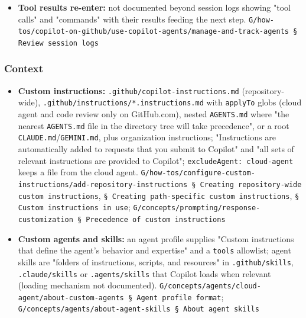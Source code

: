 \begin{itemize}
\item \textbf{Tool results re-enter:} not documented beyond session logs showing "tool calls" and "commands" with their results feeding the next step. \texttt{G/\allowbreak{}how-\allowbreak{}tos/\allowbreak{}copilot-\allowbreak{}on-\allowbreak{}github/\allowbreak{}use-\allowbreak{}copilot-\allowbreak{}agents/\allowbreak{}manage-\allowbreak{}and-\allowbreak{}track-\allowbreak{}agents § Review session logs}
\end{itemize}

\subsubsection*{Context}
\begin{itemize}
\item \textbf{Custom instructions:} \texttt{.\allowbreak{}github/\allowbreak{}copilot-\allowbreak{}instructions.\allowbreak{}md} (repository-wide), \texttt{.\allowbreak{}github/\allowbreak{}instructions/\allowbreak{}*.\allowbreak{}instructions.\allowbreak{}md} with \texttt{applyTo} globs (cloud agent and code review only on GitHub.com), nested \texttt{AGENTS.\allowbreak{}md} where "the nearest \texttt{AGENTS.\allowbreak{}md} file in the directory tree will take precedence", or a root \texttt{CLAUDE.\allowbreak{}md}/\texttt{GEMINI.\allowbreak{}md}, plus organization instructions; "Instructions are automatically added to requests that you submit to Copilot" and "all sets of relevant instructions are provided to Copilot"; \texttt{excludeAgent:\allowbreak{} cloud-\allowbreak{}agent} keeps a file from the cloud agent. \texttt{G/\allowbreak{}how-\allowbreak{}tos/\allowbreak{}configure-\allowbreak{}custom-\allowbreak{}instructions/\allowbreak{}add-\allowbreak{}repository-\allowbreak{}instructions § Creating repository-\allowbreak{}wide custom instructions}, \texttt{§ Creating path-\allowbreak{}specific custom instructions}, \texttt{§ Custom instructions in use}; \texttt{G/\allowbreak{}concepts/\allowbreak{}prompting/\allowbreak{}response-\allowbreak{}customization § Precedence of custom instructions}
\item \textbf{Custom agents and skills:} an agent profile supplies "Custom instructions that define the agent's behavior and expertise" and a \texttt{tools} allowlist; agent skills are "folders of instructions, scripts, and resources" in \texttt{.\allowbreak{}github/\allowbreak{}skills}, \texttt{.\allowbreak{}claude/\allowbreak{}skills} or \texttt{.\allowbreak{}agents/\allowbreak{}skills} that Copilot loads when relevant (loading mechanism not documented). \texttt{G/\allowbreak{}concepts/\allowbreak{}agents/\allowbreak{}cloud-\allowbreak{}agent/\allowbreak{}about-\allowbreak{}custom-\allowbreak{}agents § Agent profile format}; \texttt{G/\allowbreak{}concepts/\allowbreak{}agents/\allowbreak{}about-\allowbreak{}agent-\allowbreak{}skills § About agent skills}

\end{itemize}
